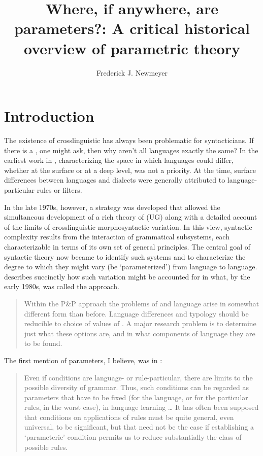 \documentclass[output=paper,
modfonts
]{LSP/langsci}
\title{Where, if anywhere, are parameters?: A critical historical overview of parametric theory}
\author{%
Frederick J. Newmeyer\affiliation{University of Washington, University of British Columbia, and Simon Fraser University}
}
\begin{document}
\maketitle

\section{Introduction}

The existence of crosslinguistic  has always been problematic
for syntacticians. If there is a
, one might ask, then why aren't all languages exactly
the same? In the earliest work in , characterizing the
space in which languages could differ, whether at the surface or at a
deep level, was not a priority. At the time, surface differences between
languages and dialects were generally attributed to language-particular
rules or filters.

In the late 1970s, however, a strategy was developed that allowed the
simultaneous development of a rich theory of  (UG)
along with a detailed account of the limits of crosslinguistic
morphosyntactic variation. In this view, syntactic complexity results
from the interaction of grammatical subsystems, each characterizable in
terms of its own set of general principles. The central goal of
syntactic theory now became to identify such systems and to characterize
the degree to which they might vary (be `parameterized') from language
to language. \citet{chomsky1995} describes succinctly how such variation
might be accounted for in what, by the early 1980s, was called the
 approach.

\begin{quote}
Within the P\&P approach the problems of  and language 
arise in somewhat different form than before. Language differences and
typology should be reducible to choice of values of . A major
research problem is to determine just what these options are, and in
what components of language they are to be found. \citep[6]{chomsky1995}
\end{quote}

The first mention of parameters, I believe, was in \citet{chomsky1976}:

\begin{quote}
Even if conditions are language- or rule-particular, there are limits to
the possible diversity of grammar. Thus, such conditions can be regarded
as parameters that have to be fixed (for the language, or for the
particular rules, in the worst case), in language learning \ldots{} It
has often been supposed that conditions on applications of rules must be
quite general, even universal, to be significant, but that need not be
the case if establishing a `parameteric' condition permits us to reduce
substantially the class of possible rules. \citep[315]{chomsky1976}
\end{quote}
\end{document}
